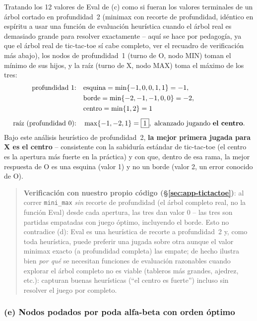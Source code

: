 \documentclass[11pt,onecolumn,letterpaper]{article}
\newcommand{\code}[1]{\texttt{#1}}
\begin{document}
Tratando los 12 valores de Eval de (c) como si fueran los valores terminales de un \'arbol
cortado en profundidad~2 (minimax con recorte de profundidad, id\'entico en esp\'iritu a
usar una funci\'on de evaluaci\'on heur\'istica cuando el \'arbol real es demasiado grande
para resolver exactamente -- aqu\'i se hace por pedagog\'ia, ya que el \'arbol real de
tic-tac-toe s\'i cabe completo, ver el recuadro de verificaci\'on m\'as abajo), los nodos de
profundidad~1 (turno de O, nodo MIN) toman el m\'inimo de sus hijos, y la ra\'iz (turno de
X, nodo MAX) toma el m\'aximo de los tres:
\begin{align*}
\text{profundidad 1:}\quad & \text{esquina}=\min\{-1,0,0,1,1\}=-1, \\
                            & \text{borde}=\min\{-2,-1,-1,0,0\}=-2, \\
                            & \text{centro}=\min\{1,2\}=1 \\[4pt]
\text{ra\'iz}\ (\text{profundidad 0):}\quad & \max\{-1,-2,1\} = \boxed{1},\ \text{alcanzado jugando \textbf{el centro}.}
\end{align*}
Bajo este an\'alisis heur\'istico de profundidad~2, \textbf{la mejor primera jugada para X
es el centro} -- consistente con la sabidur\'ia est\'andar de tic-tac-toe (el centro es la
apertura m\'as fuerte en la pr\'actica) y con que, dentro de esa rama, la mejor respuesta de
O es una esquina (valor 1) y no un borde (valor 2, un error conocido de O).

\begin{quotation}
\noindent\small\textbf{Verificaci\'on con nuestro propio c\'odigo (\S\ref{sec:app-tictactoe})}: al
correr \code{mini\_max} \emph{sin} recorte de profundidad (el \'arbol completo real, no la
funci\'on Eval) desde cada apertura, las tres dan valor $0$ -- las tres son partidas
empatadas con juego \'optimo, incluyendo el borde. Esto no contradice (d): Eval es una
heur\'istica de recorte a profundidad~2 y, como toda heur\'istica, puede preferir una
jugada sobre otra aunque el valor minimax exacto (a profundidad completa) las empate; de
hecho ilustra bien \emph{por qu\'e} se necesitan funciones de evaluaci\'on razonables
cuando explorar el \'arbol completo no es viable (tableros m\'as grandes, ajedrez, etc.):
capturan buenas heur\'isticas (``el centro es fuerte'') incluso sin resolver el juego por
completo.
\end{quotation}

\subsubsection*{(e) Nodos podados por poda alfa-beta con orden \'optimo}
\end{document}

